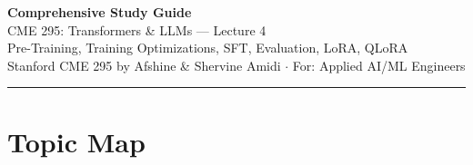 \documentclass[11pt, a4paper]{article}
\begin{document}
\begin{center}
{\LARGE\bfseries\color{defblue} Comprehensive Study Guide}\\[6pt]
{\Large CME 295: Transformers \& LLMs --- Lecture 4}\\[4pt]
{\normalsize Pre-Training, Training Optimizations, SFT, Evaluation, LoRA, QLoRA}\\[4pt]
{\small Stanford CME 295 by Afshine \& Shervine Amidi $\cdot$ For: Applied AI/ML Engineers}\\[2pt]
\rule{\textwidth}{0.4pt}
\end{center}

\tableofcontents
\newpage

\section{Topic Map}
\end{document}
